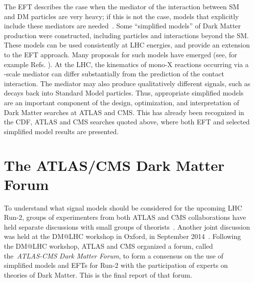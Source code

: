 The EFT describes the case when the mediator of the interaction between SM and DM particles are very heavy; 
if this is not the case, models that explicitly include these mediators are 
needed~\cite{Goodman:2010yf,Shoemaker:2011vi,Bai:2010hh,Kopp:2011eu,Fox:2011fx,Fox:2011pm,Shoemaker:2011vi,Busoni:2013lha}.
Some ``simplified models'' \cite{Alwall:2008ag,Goodman:2011jq,Alves:2011wf}
of Dark Matter production were constructed, including particles and interactions beyond the SM.
These models can be used consistently at LHC energies, and provide
an extension to the EFT approach. 
Many proposals for such models have emerged (see, for example
Refs. \cite{An:2012va,An:2012ue,Tait:2013,Buchmueller:2013dya,Bai:2013iqa,Bai:2014osa,An:2013xka,Yavin:14092893,Malik:2014ggr,Harris:2014hga,Buckley:2014fba,Haisch:2015ioa,Bai:2012xg,Carpenter:2012rg,Bell:2012rg,Petrov:2013nia,Carpenter:2013xra}). 
At the LHC, the kinematics of mono-X reactions occurring via a \tev-scale mediator can differ substantially from the prediction of the contact
interaction. The mediator may also produce qualitatively different signals, such as decays back into Standard Model particles. 
Thus, appropriate simplified models are an important component of the design, optimization, and interpretation of Dark Matter searches at ATLAS and CMS.
This has already been recognized in the CDF, ATLAS and CMS searches quoted above, where both EFT and selected simplified model
results are presented. 

\section{The ATLAS/CMS Dark Matter Forum}

To understand what signal models should be considered for the upcoming LHC Run-2, groups of experimenters from 
both ATLAS and CMS collaborations have held separate discussions with small groups of
theorists~\cite{Malik:2014ggr,Yavin:14092893}. 
Another joint discussion was held at the DM@LHC workshop in Oxford, in 
September 2014~\cite{DMatLHCProceedings}. 
Following the DM@LHC workshop, ATLAS and CMS organized a forum, called the~\textit{ATLAS-CMS Dark
Matter Forum}, to form a consensus on the use of simplified models
and EFTs for Run-2 with the participation of experts on
theories of Dark Matter. This is the final report of that forum.

